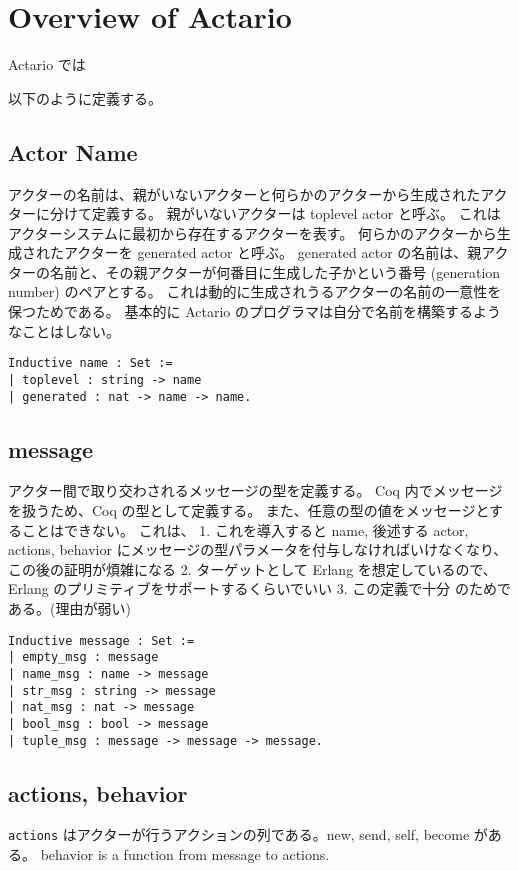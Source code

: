 \section{Overview of Actario}
\label{sec:overview}

Actario では

以下のように定義する。



\subsection{Actor Name}
アクターの名前は、親がいないアクターと何らかのアクターから生成されたアクターに分けて定義する。
親がいないアクターは toplevel actor と呼ぶ。
これはアクターシステムに最初から存在するアクターを表す。
何らかのアクターから生成されたアクターを generated actor と呼ぶ。
generated actor の名前は、親アクターの名前と、その親アクターが何番目に生成した子かという番号 (generation number) のペアとする。
これは動的に生成されうるアクターの名前の一意性を保つためである。
基本的に Actario のプログラマは自分で名前を構築するようなことはしない。

\begin{lstlisting}
Inductive name : Set :=
| toplevel : string -> name
| generated : nat -> name -> name.
\end{lstlisting}

\subsection{message}
アクター間で取り交わされるメッセージの型を定義する。
Coq 内でメッセージを扱うため、Coq の型として定義する。
また、任意の型の値をメッセージとすることはできない。
これは、
1. これを導入すると name, 後述する actor, actions, behavior にメッセージの型パラメータを付与しなければいけなくなり、この後の証明が煩雑になる
2. ターゲットとして Erlang を想定しているので、Erlang のプリミティブをサポートするくらいでいい
3. この定義で十分
のためである。(理由が弱い)

\begin{lstlisting}
Inductive message : Set :=
| empty_msg : message
| name_msg : name -> message
| str_msg : string -> message
| nat_msg : nat -> message
| bool_msg : bool -> message
| tuple_msg : message -> message -> message.
\end{lstlisting}

\subsection{actions, behavior}
\texttt{actions} はアクターが行うアクションの列である。new, send, self, become がある。
behavior is a function from message to actions.

